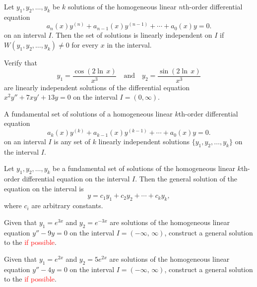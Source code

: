 \begin{theorem}
  Let \(y_1,y_2,\ldots,y_k\) be \(k\) solutions of the homogeneous linear \(n\)th-order differential equation
  \[
  a_n(x) y^{(n)} + a_{n-1}(x) y^{(n-1)} + \cdots + a_0(x) y = 0.
  \]
  on an interval \(I\).
  Then the set of solutions is linearly independent on \(I\) if \(W(y_1,y_2,\ldots,y_k)\neq 0\) for every \(x\) in the interval.
\end{theorem}


\begin{example}
  Verify that 
  \[
  y_1 = \frac{\cos{(2\ln\,x)}}{x^3} \quad \text{and} \quad y_2 = \frac{\sin{(2\ln\,x)}}{x^3}
  \]
  are linearly independent solutions of the differential equation \(x^2y'' + 7xy' + 13y = 0\) on the interval \(I = (0, \infty)\).
\end{example}


\begin{definition}
  A fundamental set of solutions of a homogeneous linear \(k\)th-order differential equation 
  \[
  a_k(x) y^{(k)} + a_{k-1}(x) y^{(k-1)} + \cdots + a_0(x) y = 0.
  \]
  on an interval \(I\) is any set of \(k\) linearly independent solutions \(\{y_1,y_2,\ldots,y_k\}\) on the interval \(I\).
\end{definition}


\begin{theorem}
   Let \(y_1,y_2,\ldots,y_k\) be a fundamental set of solutions of the homogeneous linear \(k\)th-order differential equation
   on the interval \(I\).
   Then the general solution of the equation on the interval is
   \[
   y = c_1y_1 + c_2y_2 + \cdots + c_ky_k,
   \]
   where \(c_i\) are arbitrary constants.
\end{theorem}


\begin{example}
  Given that \(y_1=e^{3x}\) and \(y_2=e^{-3x}\) are solutions  of the homogeneous linear equation \(y'' - 9y=0\) on the interval \(I=(-\infty, \,\infty)\),  construct a
  general solution to the \ode{} \textcolor{red}{if possible}. 
\end{example}


\begin{example}
  Given that \(y_1=e^{2x}\) and \(y_2=5e^{2x}\) are solutions  of the homogeneous linear equation \(y'' - 4y=0\) on the interval \(I=(-\infty, \,\infty)\),  construct a
  general solution to the \ode{} \textcolor{red}{if possible}. 
\end{example}



